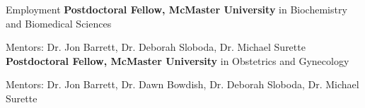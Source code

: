 \begin{rubric}{Employment}
%
\entry*[2023 -- ]%
	\textbf{Postdoctoral Fellow, McMaster University} in Biochemistry and Biomedical Sciences  
	
	Mentors: Dr. Jon Barrett, Dr. Deborah Sloboda, Dr. Michael Surette
%
\entry*[2021 -- 2023]%
	\textbf{Postdoctoral Fellow, McMaster University} in Obstetrics and Gynecology  
	
	Mentors: Dr. Jon Barrett, Dr. Dawn Bowdish, Dr. Deborah Sloboda, Dr. Michael Surette
%
\end{rubric}